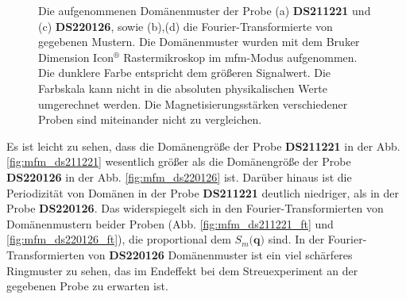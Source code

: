 \begin{figure}[H]
    \centering
    \subfloat[]{\hspace{1mm}\label{fig:mfm_ds211221_ft}}
    \hspace{1cm}
    \subfloat[]{\hspace{1mm}\label{fig:mfm_ds220126_ft}}
    \caption{Die aufgenommenen Domänenmuster der Probe (a) \textbf{DS211221} und (c) \textbf{DS220126}, sowie (b),(d) die Fourier-Transformierte von gegebenen Mustern. Die Domänenmuster wurden mit dem Bruker Dimension Icon$^{\text{®}}$ Rastermikroskop im \gls{mfm}-Modus aufgenommen. Die dunklere Farbe entspricht dem größeren Signalwert. Die Farbskala kann nicht in die absoluten physikalischen Werte umgerechnet werden. Die Magnetisierungsstärken verschiedener Proben sind miteinander nicht zu vergleichen.}
    \label{fig:mfm_amplitude_ft}
\end{figure}
\noindent
Es ist leicht zu sehen, dass die Domänengröße der Probe \textbf{DS211221} in der Abb. \ref{fig:mfm_ds211221} wesentlich größer als die Domänengröße der Probe \textbf{DS220126} in der Abb. \ref{fig:mfm_ds220126} ist. Darüber hinaus ist die Periodizität von Domänen in der Probe \textbf{DS211221} deutlich niedriger, als in der Probe  \textbf{DS220126}. Das widerspiegelt sich in den Fourier-Transformierten von Domänenmustern beider Proben (Abb. \ref{fig:mfm_ds211221_ft} und \ref{fig:mfm_ds220126_ft}), die proportional dem $S_m(\mathbf{q)}$ sind. In der Fourier-Transformierten von \textbf{DS220126} Domänenmuster ist ein viel schärferes Ringmuster zu sehen, das im Endeffekt bei dem Streuexperiment an der gegebenen Probe zu erwarten ist.


